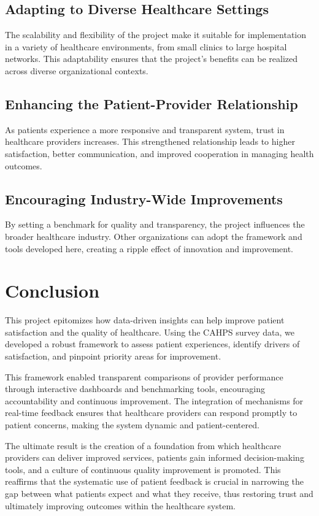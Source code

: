 \subsection{Adapting to Diverse Healthcare Settings}
The scalability and flexibility of the project make it suitable for implementation in a variety of healthcare environments, from small clinics to large hospital networks. This adaptability ensures that the project’s benefits can be realized across diverse organizational contexts.

\subsection{Enhancing the Patient-Provider Relationship}
As patients experience a more responsive and transparent system, trust in healthcare providers increases. This strengthened relationship leads to higher satisfaction, better communication, and improved cooperation in managing health outcomes.

\subsection{Encouraging Industry-Wide Improvements}
By setting a benchmark for quality and transparency, the project influences the broader healthcare industry. Other organizations can adopt the framework and tools developed here, creating a ripple effect of innovation and improvement.


\section{Conclusion}

This project epitomizes how data-driven insights can help improve patient satisfaction and the quality of healthcare. Using the CAHPS survey data, we developed a robust framework to assess patient experiences, identify drivers of satisfaction, and pinpoint priority areas for improvement.

This framework enabled transparent comparisons of provider performance through interactive dashboards and benchmarking tools, encouraging accountability and continuous improvement. The integration of mechanisms for real-time feedback ensures that healthcare providers can respond promptly to patient concerns, making the system dynamic and patient-centered.

The ultimate result is the creation of a foundation from which healthcare providers can deliver improved services, patients gain informed decision-making tools, and a culture of continuous quality improvement is promoted. This reaffirms that the systematic use of patient feedback is crucial in narrowing the gap between what patients expect and what they receive, thus restoring trust and ultimately improving outcomes within the healthcare system.



